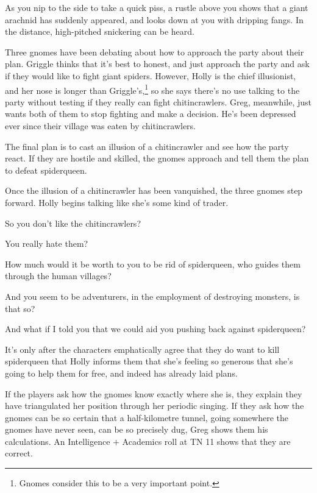 \begin{multicols}{2}
\begin{boxtext}
	As you nip to the side to take a quick piss, a rustle above you shows that a giant arachnid has suddenly appeared, and looks down at you with dripping fangs.  In the distance, high-pitched snickering can be heard.

\end{boxtext}

Three gnomes have been debating about how to approach the party about their plan.
Griggle thinks that it's best to honest, and just approach the party and ask if they would like to fight giant spiders.
However, Holly is the chief illusionist, and her nose is longer than Griggle's,\footnote{Gnomes consider this to be a very important point.} so she says there's no use talking to the party without testing if they really can fight chitincrawlers.
Greg, meanwhile, just wants both of them to stop fighting and make a decision.
He's been depressed ever since their village was eaten by chitincrawlers.

The final plan is to cast an illusion of a chitincrawler and see how the party react.  If they are hostile and skilled, the gnomes approach and tell them the plan to defeat \gls{spiderqueen}.

Once the illusion of a chitincrawler has been vanquished, the three gnomes step forward.
Holly begins talking like she's some kind of trader.

\begin{speechtext}

	So you don't like the chitincrawlers?

	You really hate them?

	How much would it be worth to you to be rid of \gls{spiderqueen}, who guides them through the human villages?

	And you seem to be adventurers, in the employment of destroying monsters, is that so?

	And what if I told you that we could aid you pushing back against \gls{spiderqueen}?

\end{speechtext}

It's only after the characters emphatically agree that they do want to kill \gls{spiderqueen} that Holly informs them that she's feeling so generous that she's going to help them for free, and indeed has already laid plans.

If the players ask how the gnomes know exactly where she is, they explain they have triangulated her position through her periodic singing.  If they ask how the gnomes can be so certain that a half-kilometre tunnel, going somewhere the gnomes have never seen, can be so precisely dug, Greg shows them his calculations.  An Intelligence + Academics roll at TN 11 shows that they are correct.


\end{multicols}
